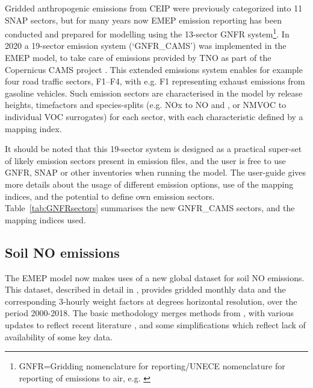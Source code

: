 Gridded anthropogenic emissions from CEIP
were previously categorized into 11
SNAP sectors, but for many years now EMEP emission reporting has been conducted and prepared for
modelling using the 13-sector
GNFR system\footnote{
GNFR=Gridding nomenclature for reporting/UNECE nomenclature for reporting of emissions to air,
e.g. \citealt{CEIP2020:GNFR}}.
In 2020 a 19-sector emission system (`GNFR\_CAMS') was implemented in the EMEP model, to take care of
emissions provided by TNO as part of the Copernicus CAMS project \citep{GranierCAMS2019,Kuenen2021}. This extended emissions system
enables for example four road traffic sectors, F1--F4, with e.g. F1
 representing exhaust emissions from gasoline vehicles.
Such emission sectors are characterised in the model by
release heights, timefactors and species-splits (e.g. NOx to NO and
, or NMVOC to individual VOC surrogates) for each sector, with each
characteristic defined by a mapping index. 

It should be noted that this 19-sector system is designed as a practical super-set of likely emission sectors present in emission files, and the  user is free to use GNFR, SNAP or other inventories when running the model. The user-guide gives more details about the usage of different emission options, use of the mapping indices, and the potential to define own emission sectors.
Table~\ref{tab:GNFRsectors} summarises the new GNFR\_CAMS sectors,
and the mapping indices used.


\subsection{Soil NO emissions}
\label{ssec:soilNO}

The EMEP model now makes uses of a new global dataset for soil NO
emissions. This dataset, described in detail in \citet{SimpsonDarras:2021},
provides gridded monthly data and the corresponding 3-hourly
weight factors at  degrees horizontal resolution, over
the period 2000-2018.  The basic methodology merges methods from
\citet{YiengerLevy:1995}, with various updates to reflect recent
literature \citep[especially][]{SteinkampLawrence2011}, and some
simplifications which reflect lack of  availability of some key data.

